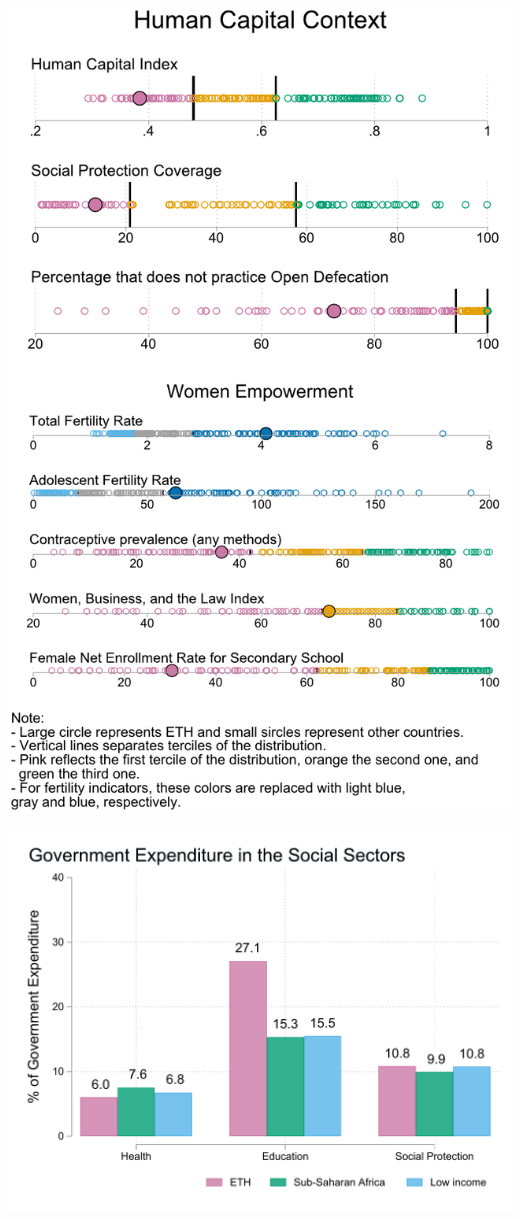 \documentclass[9.2pt,twocolumn]{article}
\begin{document}
\begin{flushright}\includegraphics[width=1\linewidth]{charts/all_mf_ETH} \end{flushright}
\vspace{3mm}

\begin{flushright}\includegraphics[width=1\linewidth,height=1.2\textheight]{charts/socsec_ETH} \end{flushright}
\vspace{3mm}
\end{document}
